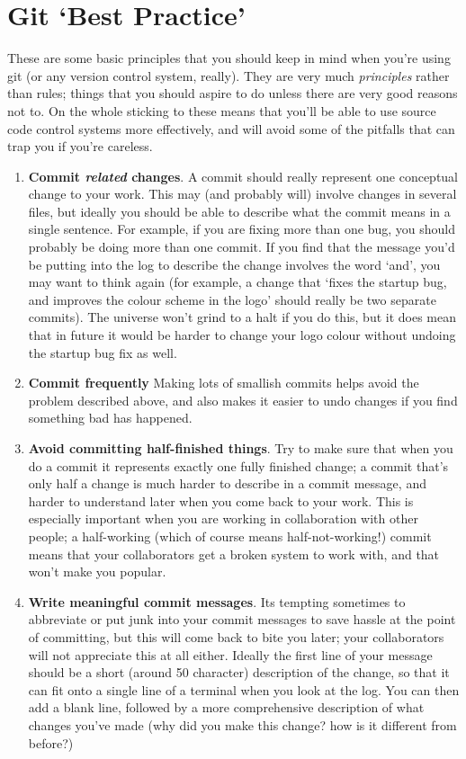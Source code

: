 \section{Git `Best Practice'}

These are some basic principles that you should keep in mind when you're using git (or any version control system, really). They are very much \emph{principles} rather than rules; things that you should aspire to do unless there are very good reasons not to. On the whole sticking to these means that you'll be able to use source code control systems more effectively, and will avoid some of the pitfalls that can trap you if you're careless. 

\begin{enumerate}
\item \textbf{Commit \emph{related} changes}. A commit should really represent one conceptual change to your work. This may (and probably will) involve changes in several files, but ideally you should be able to describe what the commit means in a single sentence. For example, if you are fixing more than one bug, you should probably be doing more than one commit. If you find that the message you'd be putting into the log to describe the change involves the word `and', you may want to think again (for example, a change that `fixes the startup bug, and improves the colour scheme in the logo' should really be two separate commits). The universe won't grind to a halt if you do this, but it does mean that in future it would be harder to change your logo colour without undoing the startup bug fix as well.

\item \textbf{Commit frequently} Making lots of smallish commits helps avoid the problem described above, and also makes it easier to undo changes if you find something bad has happened. 

\item \textbf{Avoid committing half-finished things}. Try to make sure that when you do a commit it represents exactly one fully finished change; a commit that's only half a change is much harder to describe in a commit message, and harder to understand later when you come back to your work. This is especially important when you are working in collaboration with other people; a half-working (which of course means half-not-working!) commit means that your collaborators get a broken system to work with, and that won't make you popular.

\item \textbf{Write meaningful commit messages}. Its tempting sometimes to abbreviate or put junk into your commit messages to save hassle at the point of committing, but this will come back to bite you later; your collaborators will not appreciate this at all either. Ideally the first line of your message should be a short (around 50 character) description of the change, so that it can fit onto a single line of a terminal when you look at the log. You can then add a blank line, followed by a more comprehensive description of what changes you've made (why did you make this change? how is it different from before?)


\end{enumerate}

